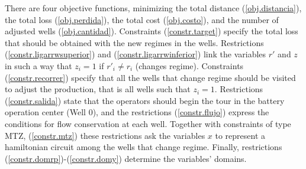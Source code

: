 There are four objective functions, minimizing the total distance (\ref{obj.distancia}), the total loss (\ref{obj.perdida}), the total cost (\ref{obj.costo}), and the number of adjusted wells (\ref{obj.cantidad}). Constraints (\ref{constr.target}) specify the total loss that should be obtained with the new regimes in the wells. Restrictions (\ref{constr.ligarrwsuperior}) and (\ref{constr.ligarrwinferior}) link the variables $r'$ and $z$ in such a way that $z_i=1$ if $r'_i\ne r_i$ (changes regime). Constraints (\ref{constr.recorrer}) specify that all the wells that change regime should be visited to adjust the production, that is all wells such that $z_i=1$. Restrictions (\ref{constr.salida}) state that the operators should begin the tour in the battery operation center (Well $0$), and the restrictions  (\ref{constr.flujo}) express the conditions for flow conservation at each well. Together with constraints of type MTZ, (\ref{constr.mtz}) these restrictions ask the variables $x$ to represent a hamiltonian circuit among the wells that change regime. Finally, restrictions (\ref{constr.domrp})-(\ref{constr.domy}) determine the variables' domains.



